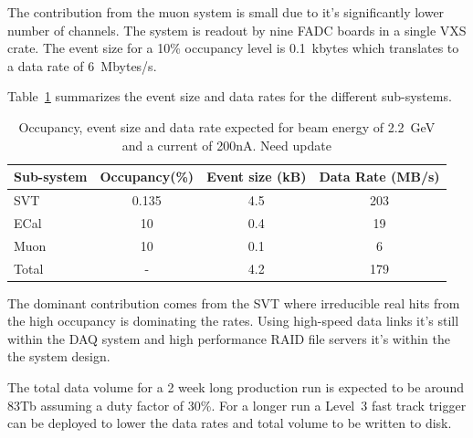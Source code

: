 The contribution from the muon system is small due to it's significantly lower number of channels. The system is readout by nine FADC boards in a single VXS crate. The event 
size for a 10\% occupancy level is 0.1~kbytes which translates to a data rate of 6~Mbytes/s. 

Table~\ref{tab:data_rates} summarizes the event size and data rates for the different 
sub-systems. 
\begin{table}[]
\centering
\begin{tabular}{l|c|c|c}
Sub-system & Occupancy(\%) & Event size (kB) & Data Rate (MB/s) \\
\hline
SVT & 0.135 & 4.5 & 203 \\
ECal & 10 & 0.4 & 19 \\
Muon & 10 & 0.1 & 6 \\
\hline
Total & - & 4.2 & 179 \\
\hline
\end{tabular}
\caption{{\small Occupancy, event size and data rate expected for beam energy of 2.2~GeV and a current of 200nA.} {\color{red}Need update}}
\label{tab:data_rates}
\end{table}
The dominant contribution comes from the SVT where irreducible real hits from the high occupancy is dominating the rates. Using high-speed data links it's still within the DAQ system and high performance RAID file servers it's within the the system design. 

The total data volume for a 2 week long production run is expected to be around 83Tb 
assuming a duty factor of 30\%.  For a longer run a Level~3 fast track trigger can 
be deployed to lower the data rates and total volume to be written to disk. 
